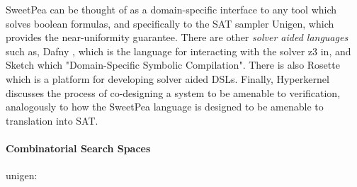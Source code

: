SweetPea can be thought of as a domain-specific interface to any tool which solves boolean formulas, and specifically to the SAT sampler Unigen, which provides the near-uniformity guarantee. There are other \emph{solver aided languages} such as, Dafny \cite{leino2013developing}, which is the language for interacting with the solver z3 in, and Sketch \cite{bodik2017domain} which "Domain-Specific Symbolic Compilation". There is also Rosette \cite{torlak2014lightweight} which is a platform for developing solver aided DSLs. Finally, Hyperkernel \cite{nelson2017hyperkernel} discusses the process of co-designing a system to be amenable to verification, analogously to how the SweetPea language is designed to be amenable to translation into SAT.


\paragraph*{Combinatorial Search Spaces}
unigen: \cite{meel2016constrained}
